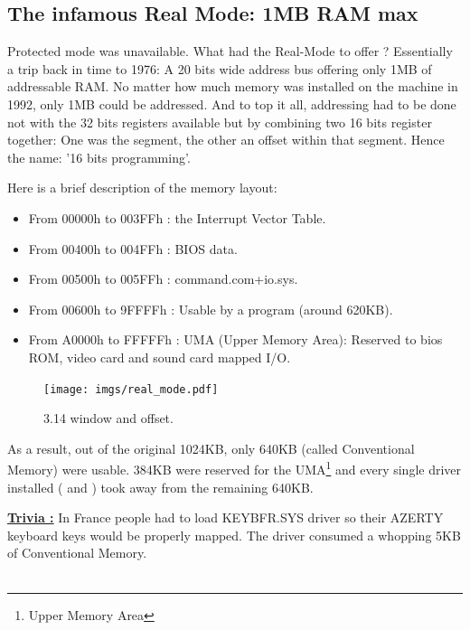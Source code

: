 \documentclass[book.tex]{subfiles}
\begin{document}
  \subsection{The infamous Real Mode: 1MB RAM max}
  Protected mode was unavailable. What had the Real-Mode to offer ? Essentially a trip back in time to 1976: A 20 bits wide address bus offering only 1MB of addressable RAM. No matter how much memory was installed on the machine in 1992, only 1MB could be addressed. And to top it all, addressing had to be done not with the 32 bits registers available but by combining two 16 bits register together: One was the segment, the other an offset within that segment. Hence the name: '16 bits programming'.

  \bigskip
Here is a brief description of the memory layout: \\
\begin{itemize}
\item From 00000h to 003FFh : the Interrupt Vector Table.
\item From 00400h to 004FFh : BIOS data.
\item From 00500h to 005FFh : command.com+io.sys.
\item From 00600h to 9FFFFh : Usable by a program (around 620KB). 
\item From A0000h to FFFFFh : UMA (Upper Memory Area): Reserved to bios ROM, video card and sound card mapped I/O.
\end{itemize}

\begin{figure}[H]
\centering
\texttt{[image: imgs/real\_mode.pdf]}

\caption{3.14 window and offset.}
\label{fig:fp_internals}
\end{figure}


As a result, out of the original 1024KB, only 640KB (called Conventional Memory) were usable. 384KB were reserved for the UMA\footnote{Upper Memory Area} and every single driver installed ( and )  took away from the remaining 640KB.

\bigskip

\textbf{\underline{Trivia :}}  In France people had to load KEYBFR.SYS driver so their AZERTY keyboard keys would be properly mapped. The driver consumed a whopping 5KB of Conventional Memory.\\
\\
\end{document}
